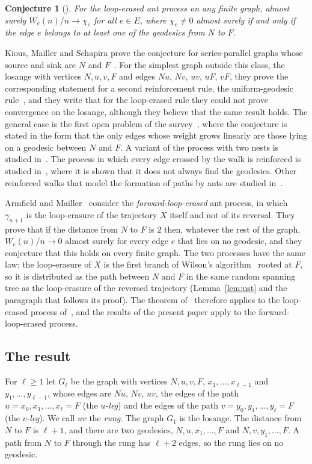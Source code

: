 \documentclass[11pt]{amsart}
\newtheorem{conjecture}[theorem]{Conjecture}
\theoremstyle{remark}
\begin{document}
\begin{conjecture}[{\cite[Conjecture~1.1(1)]{KMS}}]\label{conj}
For the loop-erased ant process on any finite graph, almost surely $W_e(n)/n\to\chi_e$ for all $e\in E$, where
$\chi_e\ne0$ almost surely if and only if the edge $e$ belongs to at least one of the geodesics from $N$ to $F$.
\end{conjecture}

Kious, Mailler and Schapira prove the conjecture for series-parallel graphs whose source and sink are $N$ and
$F$~\cite[Theorem~1.3]{KMS}. For the simplest graph outside this class, the losange with vertices $N,u,v,F$ and edges
$Nu$, $Nv$, $uv$, $uF$, $vF$, they prove the corresponding statement for a second reinforcement rule, the
uniform-geodesic rule~\cite[Theorem~1.4]{KMS}, and they write that for the loop-erased rule they could not prove
convergence on the losange, although they believe that the same result holds. The general case is the first open
problem of the survey~\cite{Aletti}, where the conjecture is stated in the form that the only edges whose weight
grows linearly are those lying on a geodesic between $N$ and $F$. A variant of the process with two nests is studied
in~\cite{MV}. The process in which every edge crossed by the walk is reinforced is studied in~\cite{KMS2}, where it is
shown that it does not always find the geodesics. Other reinforced walks that model the formation of paths by ants are
studied in~\cite{LGR,EFR,GSGC}.

Armfield and Mailler~\cite{AM} consider the \emph{forward-loop-erased} ant process, in which $\gamma_{n+1}$ is the
loop-erasure of the trajectory $X$ itself and not of its reversal. They prove that if the distance from $N$ to $F$ is
$2$ then, whatever the rest of the graph, $W_e(n)/n\to0$ almost surely for every edge $e$ that lies on no geodesic, and
they conjecture that this holds on every finite graph. The two processes have the same law: the loop-erasure of $X$ is
the first branch of Wilson's algorithm~\cite{Wilson} rooted at $F$, so it is distributed as the path between $N$ and
$F$ in the same random spanning tree as the loop-erasure of the reversed trajectory (Lemma~\ref{lem:ust} and the
paragraph that follows its proof). The theorem of~\cite{AM} therefore applies to the loop-erased process of~\cite{KMS}, and the
results of the present paper apply to the forward-loop-erased process.

\subsection{The result}
For $\ell\ge1$ let $G_\ell$ be the graph with vertices $N,u,v,F$, $x_1,\dots,x_{\ell-1}$ and $y_1,\dots,y_{\ell-1}$,
whose edges are $Nu$, $Nv$, $uv$, the edges of the path $u=x_0,x_1,\dots,x_\ell=F$ (the \emph{$u$-leg}) and the edges
of the path $v=y_0,y_1,\dots,y_\ell=F$ (the \emph{$v$-leg}). We call $uv$ the \emph{rung}. The graph $G_1$ is the
losange. The distance from $N$ to $F$ is $\ell+1$, and there are two geodesics, $N,u,x_1,\dots,F$ and
$N,v,y_1,\dots,F$. A path from $N$ to $F$ through the rung has $\ell+2$ edges, so the rung lies on no geodesic.
\end{document}
